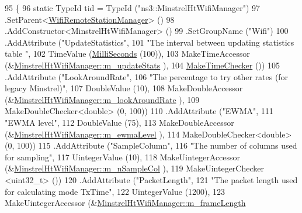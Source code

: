 \begin{DoxyCode}
95 \{
96   \textcolor{keyword}{static} TypeId tid = TypeId (\textcolor{stringliteral}{"ns3::MinstrelHtWifiManager"})
97     .SetParent<\hyperlink{classns3_1_1WifiRemoteStationManager_a78524840f5900e1937e8e2d6df48954d}{WifiRemoteStationManager}> ()
98     .AddConstructor<MinstrelHtWifiManager> ()
99     .SetGroupName (\textcolor{stringliteral}{"Wifi"})
100     .AddAttribute (\textcolor{stringliteral}{"UpdateStatistics"},
101                    \textcolor{stringliteral}{"The interval between updating statistics table "},
102                    TimeValue (\hyperlink{group__timecivil_gaf26127cf4571146b83a92ee18679c7a9}{MilliSeconds} (100)),
103                    MakeTimeAccessor (&\hyperlink{classns3_1_1MinstrelHtWifiManager_a5c7d923b77d5cd3a1d38810ed41f91f8}{MinstrelHtWifiManager::m\_updateStats}
      ),
104                    \hyperlink{group__time_ga7032965bd4afa578691d88c09e4481c1}{MakeTimeChecker} ())
105     .AddAttribute (\textcolor{stringliteral}{"LookAroundRate"},
106                    \textcolor{stringliteral}{"The percentage to try other rates (for legacy Minstrel)"},
107                    DoubleValue (10),
108                    MakeDoubleAccessor (&\hyperlink{classns3_1_1MinstrelHtWifiManager_a7db397626b2dff4bd62619aa7fec75af}{MinstrelHtWifiManager::m\_lookAroundRate}
      ),
109                    MakeDoubleChecker<double> (0, 100))
110     .AddAttribute (\textcolor{stringliteral}{"EWMA"},
111                    \textcolor{stringliteral}{"EWMA level"},
112                    DoubleValue (75),
113                    MakeDoubleAccessor (&\hyperlink{classns3_1_1MinstrelHtWifiManager_ace0a340f6c702f416f3dc9fed71105d1}{MinstrelHtWifiManager::m\_ewmaLevel}
      ),
114                    MakeDoubleChecker<double> (0, 100))
115     .AddAttribute (\textcolor{stringliteral}{"SampleColumn"},
116                    \textcolor{stringliteral}{"The number of columns used for sampling"},
117                    UintegerValue (10),
118                    MakeUintegerAccessor (&\hyperlink{classns3_1_1MinstrelHtWifiManager_afc2db9ea273b3599cb09ccbf73f866e0}{MinstrelHtWifiManager::m\_nSampleCol}
      ),
119                    MakeUintegerChecker <uint32\_t> ())
120     .AddAttribute (\textcolor{stringliteral}{"PacketLength"},
121                    \textcolor{stringliteral}{"The packet length used for calculating mode TxTime"},
122                    UintegerValue (1200),
123                    MakeUintegerAccessor (&\hyperlink{classns3_1_1MinstrelHtWifiManager_a069e6a4b77dc080d720a4b076cd8d7c5}{MinstrelHtWifiManager::m\_frameLength}

\end{DoxyCode}

